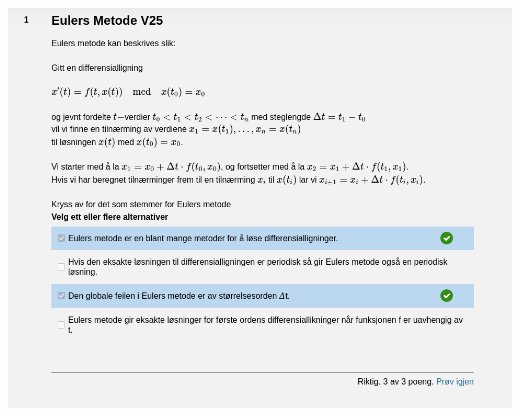 \documentclass[12pt]{article}
\begin{document}
\includegraphics[width=\textwidth]{Screenshot_20250521_134257.png}
\newpage
\end{document}

